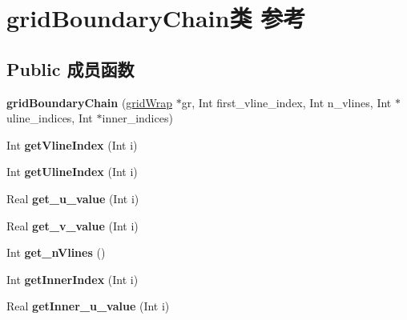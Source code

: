 \hypertarget{classgrid_boundary_chain}{}\section{grid\+Boundary\+Chain类 参考}
\label{classgrid_boundary_chain}
\subsection*{Public 成员函数}
\begin{DoxyCompactItemize}
\item 
\mbox{\label{classgrid_boundary_chain_a3a85d8d230196acf9cf2af9680ed48e3}} 
{\bfseries grid\+Boundary\+Chain} (\hyperlink{classgrid_wrap}{grid\+Wrap} $\ast$gr, Int first\+\_\+vline\+\_\+index, Int n\+\_\+vlines, Int $\ast$uline\+\_\+indices, Int $\ast$inner\+\_\+indices)
\item 
\mbox{\label{classgrid_boundary_chain_a59e7596d45e22b2ab2582e96177468f3}} 
Int {\bfseries get\+Vline\+Index} (Int i)
\item 
\mbox{\label{classgrid_boundary_chain_aa215d89cf739bca859f0dc544a35a357}} 
Int {\bfseries get\+Uline\+Index} (Int i)
\item 
\mbox{\label{classgrid_boundary_chain_a997bc1712a0cfcb171700983a71cbf1b}} 
Real {\bfseries get\+\_\+u\+\_\+value} (Int i)
\item 
\mbox{\label{classgrid_boundary_chain_a81210909e57b3160ce6d4708e234fa4e}} 
Real {\bfseries get\+\_\+v\+\_\+value} (Int i)
\item 
\mbox{\label{classgrid_boundary_chain_a5f7efceb829f514243ff2341642f5663}} 
Int {\bfseries get\+\_\+n\+Vlines} ()
\item 
\mbox{\label{classgrid_boundary_chain_a92e40e6bfd0910bf5e94f3851e091d34}} 
Int {\bfseries get\+Inner\+Index} (Int i)
\item 
\mbox{\label{classgrid_boundary_chain_a1d4db419202f37c51a6b69f60ba5b260}} 
Real {\bfseries get\+Inner\+\_\+u\+\_\+value} (Int i)

\end{DoxyCompactItemize}
